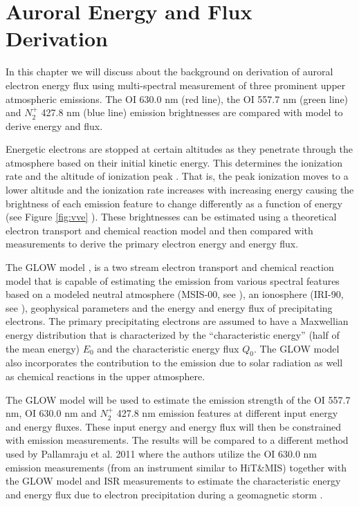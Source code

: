 \chapter{Auroral Energy and Flux Derivation} \label{chap:energy}

In this chapter we will discuss about the background on derivation of auroral electron energy flux using multi-spectral measurement of three prominent upper atmospheric emissions. The OI 630.0 nm (red line), the OI 557.7 nm (green line) and $N_{2}^{+}$ 427.8 nm (blue line) emission brightnesses are compared with model to derive energy and flux.

Energetic electrons are stopped at certain altitudes as they penetrate through the atmosphere based on their initial kinetic energy. This determines the ionization rate and the altitude of ionization peak \citep{rees_1963}. That is, the peak ionization moves to a lower altitude and the ionization rate increases with increasing energy causing the brightness of each emission feature to change differently as a function of energy (see Figure \ref{fig:vve} ). These brightnesses can be estimated using a theoretical electron transport and chemical reaction model and then compared with measurements to derive the primary electron energy and energy flux. 



The GLOW model \citep{solomon_1988}, is a two stream electron transport and chemical reaction model that is capable of estimating the emission from various spectral features based on a modeled neutral atmosphere (MSIS-00, see \citet{msie}), an ionosphere (IRI-90, see \citet{iri}), geophysical parameters and the energy and energy flux of precipitating electrons. The primary precipitating electrons are assumed to have a Maxwellian energy distribution that is characterized by the “characteristic energy” (half of the mean energy) $E_0$ and the characteristic energy flux $Q_0$. The GLOW model also incorporates the contribution to the emission due to solar radiation as well as chemical reactions in the upper atmosphere.  



The GLOW model will be used to estimate the emission strength of the OI 557.7 nm, OI 630.0 nm and  $N_{2}^{+}$  427.8 nm emission features at different input energy and energy fluxes. These input energy and energy flux will then be constrained with emission measurements. The results will be compared to a different method used by Pallamraju et al. 2011 where the authors utilize the OI 630.0 nm emission measurements (from an instrument similar to HiT\&MIS) together with the GLOW model and ISR measurements to estimate the characteristic energy and energy flux due to electron precipitation during a geomagnetic storm \citep{pallamraju_2011}.

